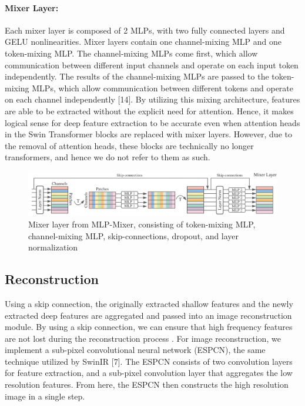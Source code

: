 \documentclass{article}
\begin{document}
\paragraph{Mixer Layer:} Each mixer layer is composed of 2 MLPs, with two fully connected layers and GELU nonlinearities. Mixer layers contain one channel-mixing MLP and one token-mixing MLP. The channel-mixing MLPs come first, which allow communication between different input channels and operate on each input token independently. The results of the channel-mixing MLPs are passed to the token-mixing MLPs, which allow communication between different tokens and operate on each channel independently [14]. By utilizing this mixing architecture, features are able to be extracted without the explicit need for attention. Hence, it makes logical sense for deep feature extraction to be accurate even when attention heads in the Swin Transformer blocks are replaced with mixer layers. However, due to the removal of attention heads, these blocks are technically no longer transformers, and hence we do not refer to them as such.

\begin{figure}\label{fig:mixer}
    \centering
    \includegraphics[width=\textwidth]{mixer-layer.png}
    \caption{Mixer layer from MLP-Mixer, consisting of token-mixing MLP, channel-mixing MLP, skip-connections, dropout, and layer normalization}
\end{figure}

\subsection{Reconstruction}

Using a skip connection, the originally extracted shallow features and the newly extracted deep features are aggregated and passed into an image reconstruction module. By using a skip connection, we can ensure that high frequency features are not lost during the reconstruction process \citep{liang2021swinir}. For image reconstruction, we implement a sub-pixel convolutional neural network (ESPCN), the same technique utilized by SwinIR [7]. The ESPCN consists of two convolution layers for feature extraction, and a sub-pixel convolution layer that aggregates the low resolution features. From here, the ESPCN then constructs the high resolution image in a single step.
\end{document}
